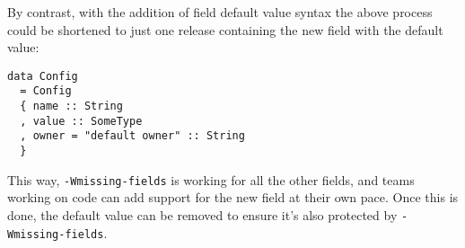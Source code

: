 \documentclass[en]{pracamgr}
\newcommand{\code}[1]{\lstinline[breaklines=true]{#1}}
\begin{document}
By contrast, with the addition of field default value syntax the above process could be shortened 
to just one \infra{} release containing the new field with the default value:\\
\begin{minipage}{\linewidth}
\begin{lstlisting}
data Config 
  = Config
  { name :: String
  , value :: SomeType
  , owner = "default owner" :: String
  }
\end{lstlisting}
\end{minipage}
This way, \code{-Wmissing-fields} is working for all the other fields, and teams working on \user{}
code can add support for the new field at their own pace.
Once this is done, the default value can be removed to ensure it's also protected by \code{-Wmissing-fields}.
\end{document}
